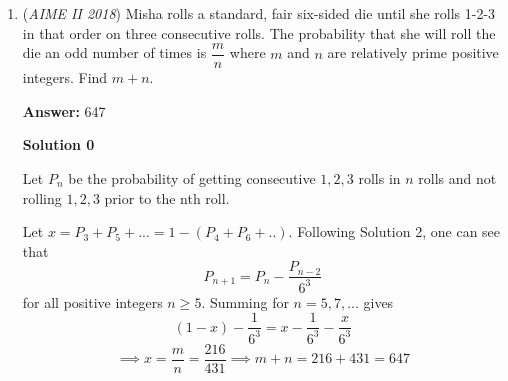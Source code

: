 \begin{enumerate}
 $a^2 + 18 - 6\sqrt{2} \cdot a \cdot \frac{4\sqrt{2}}{a} = 100 \implies a^2 + 18 - 48 = 100 \implies a^2 = 130$

 Now $\sin(\theta) = \sqrt{1 - \frac{32}{a^2}}$ following the Pythagorean Identity. Now $a^2 = 130$ so we have

 $\sin(\theta) = \sqrt{1 - \frac{32}{130}} = \sqrt{\frac{98}{130}} = \frac{7\sqrt{2}}{\sqrt{130}}$. Hence the answer is 

 $\frac{7\sqrt{2}}{\sqrt{130}} \cdot 8\sqrt{2} \cdot \sqrt{130} = 7\sqrt{2} \cdot 8\sqrt{2} = 56 \cdot 2 = \boxed{112}$.

 



\textbf{Solution 13(cheese)}

The $AD = 2\sqrt{65}$ condition motivates us to find right triangles with integer sides and $2\sqrt{65}$ as the hypotenuse. Indeed, we have $2^2 + 16^2 = (2\sqrt{65})^2$. Furthermore, notice that $10$ is the hypotenuse of a $6-8-10$ right triangle. It follows that quadrilateral $ABCD$ is an $8 \times 22$ rectangle with triangles of sides $6-8-10$, $2-16-2\sqrt{65}$, and $6-8-10$ cut out from three of its corners. Thus, the area of $ABCD$ is $(8)(22) - \frac{1}{2}((6)(8) + (2)(16) + (6)(8)) = \boxed{112}$.

 This solution is very good for quick computational contests like AIME(I did NOT write this solution btw)~ilikemath247365

 


	\item (\textit{AIME II 2018}) Misha rolls a standard, fair six-sided die until she rolls 1-2-3 in that order on three consecutive rolls. The probability that she will roll the die an odd number of times is $\dfrac{m}{n}$ where $m$ and $n$ are relatively prime positive integers. Find $m+n$.


 
 \textbf{Answer: }647



\textbf{Solution 0}

Let $P_n$ be the probability of getting consecutive $1,2,3$ rolls in $n$ rolls and not rolling $1,2,3$ prior to the nth roll. 

 Let $x = P_3+P_5+...=1-(P_4+P_6+..)$. Following Solution 2, one can see that
 \[P_{n+1}=P_{n}-\frac{P_{n-2}}{6^3}\]for all positive integers $n \ge 5$. Summing for $n=5,7,...$ gives
 \[(1-x)-\frac{1}{6^3}=x-\frac{1}{6^3}-\frac{x}{6^3}\]
 \[\implies x = \frac{m}{n} = \frac{216}{431} \implies m+n=216+431= \boxed{647}\]





\end{enumerate}
